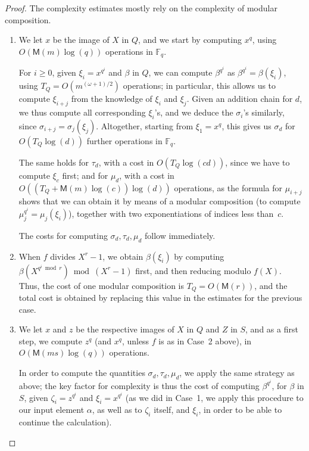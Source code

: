 \documentclass{mcom-l}
\theoremstyle{plain}
\theoremstyle{definition}
\newcommand{\F}{\ensuremath{\mathbb{F}}}
\newcommand{\MM}{\ensuremath{\mathsf{M}}}
\begin{document}
\begin{proof}
The complexity estimates mostly rely on the complexity of modular composition.
\begin{enumerate}[label=\textbf{Case~\theenumi.},leftmargin=*, align=left]
\item
  We let $x$ be the image of $X$ in $Q$, and we
  start by computing $x^q$, using $O(\MM(m)\log(q))$ operations in
  $\F_q$.

  For $i \ge 0$, given $\xi_i = x^{q^i}$ and $\beta$ in $Q$, we can
  compute $\beta^{q^i}$ as $\beta^{q^i}=\beta(\xi_i)$, using
  $T_Q=O(m^{(\omega+1)/2})$ operations; in particular, this allows us to
  compute $\xi_{i+j}$ from the knowledge of $\xi_i$ and $\xi_j$. Given
  an addition chain for $d$, we thus compute all corresponding
  $\xi_i$'s, and we deduce the $\sigma_i$'s similarly, since
  $\sigma_{i+j}=\sigma_j(\xi_j)$. Altogether, starting from
  $\xi_1=x^q$, this gives us $\sigma_d$ for $O(T_Q\log(d))$
  further operations in $\F_q$.

  The same holds for $\tau_d$, with a cost in $O(T_Q\log(cd))$,
  since we have to compute $\xi_c$ first;
  and for $\mu_d$, with a cost in
  $O((T_Q + \MM(m)\log(c))\log(d))$ operations,
  as the formula for $\mu_{i+j}$ shows that
  we can obtain it by means of a modular composition
  (to compute $\mu_j^{q^i}=\mu_j(\xi_i)$), together with
  two exponentiations of indices less than~$c$.

  The costs for computing $\sigma_d, \tau_d, \mu_d$ follow immediately.

\item
  When $f$ divides $X^r-1$, we obtain $\beta(\xi_i)$ by computing
  $\beta(X^{q^i \bmod r}) \bmod (X^r-1)$ first, and then reducing
  modulo $f(X)$.  %
  Thus, the cost of one modular composition is $T_Q=O(\MM(r))$, and
  the total cost is obtained by replacing this value in the estimates
  for the previous case.

\item
  We let $x$ and $z$ be the respective images of $X$ in $Q$ and $Z$ in $S$,
  and as a first step, we compute $z^q$ (and $x^q$, unless $f$ is as
  in Case~2 above), in $O(\MM(ms)\log(q))$ operations.
  
  In order to compute
  the quantities $\sigma_d,\tau_d,\mu_d$, we apply the same strategy
  as above; the key factor for complexity is thus the cost of
  computing $\beta^{q^i}$, for $\beta$ in $S$, given $\zeta_i =
  z^{q^i}$ and $\xi_i=x^{q^i}$ (as we did in Case~1, we apply this
  procedure to our input element $\alpha$, as well as to $\zeta_i$
  itself, and $\xi_i$, in order to be able to continue the
  calculation).


\end{enumerate}
\end{proof}
\end{document}
